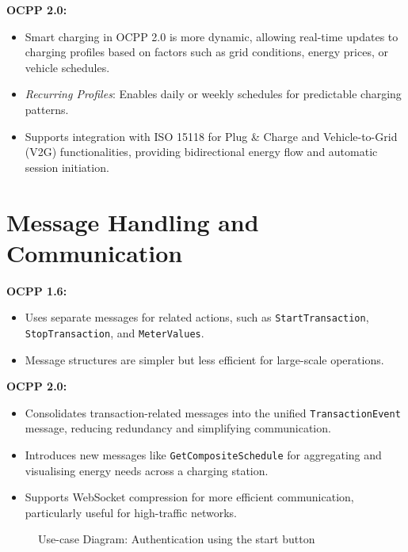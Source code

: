 \documentclass[12pt,a4paper]{report}
\begin{document}
\textbf{OCPP 2.0:}
\begin{itemize}
  \item Smart charging in OCPP 2.0 is more dynamic, allowing real-time updates to charging
        profiles based on factors such as grid conditions, energy prices, or vehicle schedules.
  \item \textit{Recurring Profiles}: Enables daily or weekly schedules for predictable
        charging patterns.
  \item Supports integration with ISO 15118 for Plug \& Charge and Vehicle-to-Grid (V2G)
        functionalities, providing bidirectional energy flow and automatic session initiation.
\end{itemize}

\section{Message Handling and Communication}

\textbf{OCPP 1.6:}
\begin{itemize}
  \item Uses separate messages for related actions, such as \texttt{StartTransaction},
        \texttt{StopTransaction}, and \texttt{MeterValues}.
  \item Message structures are simpler but less efficient for large-scale operations.
\end{itemize}

\textbf{OCPP 2.0:}
\begin{itemize}
  \item Consolidates transaction-related messages into the unified \texttt{TransactionEvent}
        message, reducing redundancy and simplifying communication.
  \item Introduces new messages like \texttt{GetCompositeSchedule} for aggregating and
        visualising energy needs across a charging station.
  \item Supports WebSocket compression for more efficient communication, particularly useful
        for high-traffic networks.
\end{itemize}

\begin{figure}[h!]
  \centering
  \caption{Use-case Diagram: Authentication using the start button}
  \label{fig:usecase-auth}
\end{figure}
\end{document}
